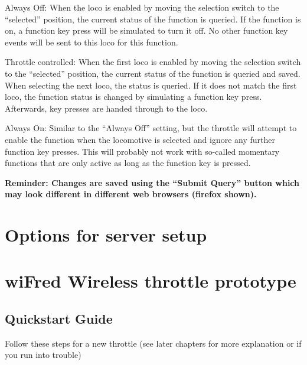 \documentclass[11pt,a4paper]{scrartcl}
\begin{document}
\begin{description}
\item{Always Off:} When the loco is enabled by moving the selection switch to the ``selected'' position, the current status of the function is queried. If the function is on, a function key press will be simulated to turn it off. No other function key events will be sent to this loco for this function.
\item{Throttle controlled:} When the first loco is enabled by moving the selection switch to the ``selected'' position, the current status of the function is queried and saved. When selecting the next loco, the status is queried. If it does not match the first loco, the function status is changed by simulating a function key press. Afterwards, key presses are handed through to the loco.
\item{Always On:} Similar to the ``Always Off'' setting, but the throttle will attempt to enable the function when the locomotive is selected and ignore any further function key presses. This will probably not work with so-called momentary functions that are only active as long as the function key is pressed.
\end{description}

\textbf{Reminder: Changes are saved using the ``Submit Query'' button which may look different in different web browsers (firefox shown).}

\clearpage

\section{Options for server setup}

\clearpage

\section{wiFred Wireless throttle prototype} \label{oldThrottle}

\subsection{Quickstart Guide}

Follow these steps for a new throttle (see later chapters for more explanation or if you run into trouble)
\end{document}
